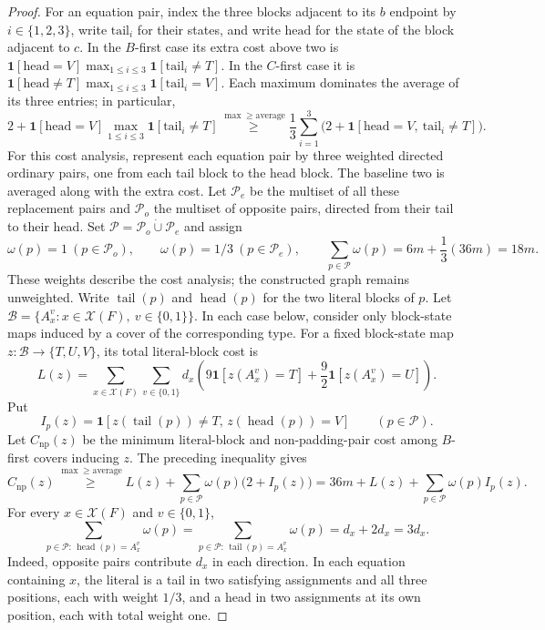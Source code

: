 \begin{proof}
For an equation pair, index the three blocks adjacent to its $b$
endpoint by $i\in\{1,2,3\}$, write $\text{tail}_i$ for their states,
and write $\text{head}$ for the state of the block adjacent to $c$.
In the $B$-first case its extra cost above two is
$\mathbf1[\text{head}=V]\max_{1\leq i\leq3}\mathbf1[\text{tail}_i\ne T]$.
In the $C$-first case it is
$\mathbf1[{\text{head}\ne T}]\max_{1\leq i\leq3}\mathbf1[\text{tail}_i=V]$.
Each maximum dominates the average of its three entries; in particular,
\[
 2+\mathbf1[\text{head}=V]\max_{1\leq i\leq3}
                        \mathbf1[\text{tail}_i\ne T]
 \overset{\max\geq\text{average}}{\geq}
 \frac13\sum_{i=1}^3
       \bigl(2+\mathbf1[\text{head}=V,\ \text{tail}_i\ne T]\bigr).
\]
For this cost analysis, represent each equation pair by three weighted
directed ordinary pairs, one from each tail block to the head block.
The baseline two is averaged along with the extra cost. Let $\mathcal P_e$
be the multiset of all these replacement pairs and $\mathcal P_o$ the
multiset of opposite pairs, directed from their tail to their head. Set
$\mathcal P=\mathcal P_o\mathbin{\dot\cup}\mathcal P_e$ and assign
\[
 \omega(p)=1\ (p\in\mathcal P_o),\qquad \omega(p)=1/3\ (p\in\mathcal P_e),\qquad \sum_{p\in\mathcal P}\omega(p)=6m+\frac13(36m)=18m.
\]
These weights describe the cost analysis; the constructed graph
remains unweighted. Write $\operatorname{tail}(p)$ and
$\operatorname{head}(p)$ for the two literal blocks of $p$.
Let $\mathcal B=\{A_x^v:x\in\mathcal X(F),\ v\in\{0,1\}\}$.
In each case below, consider only block-state maps induced by a
cover of the corresponding type.
For a fixed block-state map $z:\mathcal B\to\{T,U,V\}$, its total
literal-block cost is
\[
 L(z)=\sum_{x\in\mathcal X(F)}\sum_{v\in\{0,1\}}
 d_x\left(9\mathbf1[z(A_x^v)=T]
              +\frac92\mathbf1[z(A_x^v)=U]\right).
\]
Put
\[
 I_p(z)=\mathbf1[z(\operatorname{tail}(p))\ne T,\,
                 z(\operatorname{head}(p))=V]
 \qquad(p\in\mathcal P).
\]
Let $C_{\mathrm{np}}(z)$ be the minimum literal-block and non-padding-pair
cost among $B$-first covers inducing $z$. The preceding inequality gives
\begin{equation}\label{eq:np-total-depth-weighted-surrogate}
 C_{\mathrm{np}}(z)
 \overset{\max\geq\text{average}}{\geq}
 L(z)+\sum_{p\in\mathcal P}\omega(p)\bigl(2+I_p(z)\bigr)
 =36m+L(z)+\sum_{p\in\mathcal P}\omega(p)I_p(z).
\end{equation}
For every $x\in\mathcal X(F)$ and $v\in\{0,1\}$,
\begin{equation}\label{eq:np-total-depth-pair-degrees}
 \sum_{p\in\mathcal P:\,\operatorname{head}(p)=A_x^v}\omega(p)
 =
 \sum_{p\in\mathcal P:\,\operatorname{tail}(p)=A_x^v}\omega(p)
 =d_x+2d_x=3d_x.
\end{equation}
Indeed, opposite pairs contribute $d_x$ in each direction. In each
equation containing $x$, the literal is a tail in two satisfying
assignments and all three positions, each with weight $1/3$, and a
head in two assignments at its own position, each with total weight one.


\end{proof}
